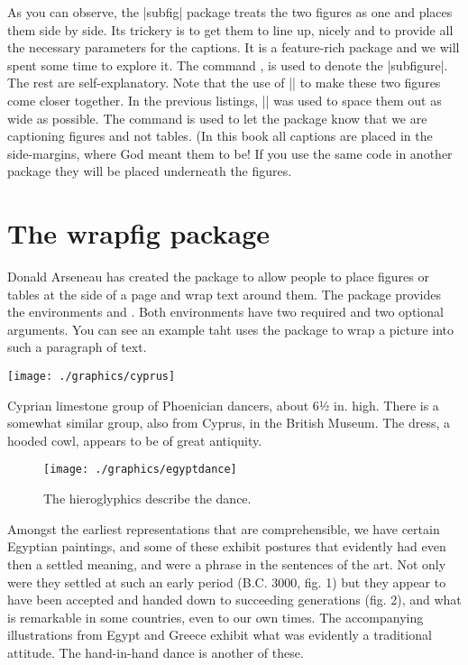 As you can observe, the |subfig| package treats the two figures as one and places them side by side. Its trickery is to get them to line up, nicely and to provide all the necessary parameters for the captions. It is a feature-rich package and we will spent some time to explore it. The command , is used to denote the |subfigure|. The rest are self-explanatory. Note that the use of |\hspace{1cm}| to make these two figures come closer together. In the previous listings, |\hfill| was used to space them out as wide as possible. The command  is used to let the package know that we are captioning figures and not tables. (In this book all captions are placed in the side-margins, where God meant them to be! If you use the same code in another package they will be placed underneath the figures.


\section{The wrapfig package}


\captionsetup[wrapfigure]{margin=10pt,font=small,labelfont=bf, name=Fig.} %


Donald Arseneau has created the  package to allow people to place figures or
tables at the side of a page and wrap text around them. The package provides the
environments  and . Both environments have two required and
two optional arguments. You can see an example taht uses the package to wrap a picture into such a paragraph of text.
\begin{marginfigure}[82pt]
   \texttt{[image: ./graphics/cyprus]} 
   \caption{\small Cyprian limestone group of Phoenician dancers, about 6½ in. high. There is a somewhat similar group, also from Cyprus, in the British Museum. The dress, a hooded cowl, appears to be of great antiquity.}
\end{marginfigure}
\begin{wrapfigure}[20]{l}{3.8cm}
\centering\small
\texttt{[image: ./graphics/egyptdance]}  %
\caption{\small The hieroglyphics describe the dance.}
\end{wrapfigure}
Amongst the earliest representations that are comprehensible, we have certain Egyptian paintings, and some of these exhibit postures that evidently had even then a settled meaning, and were a phrase in the sentences of the art. Not only were they settled at such an early period (B.C. 3000, fig. 1) but they appear to have been accepted and handed down to succeeding generations (fig. 2), and what is remarkable in some countries, even to our own times. The accompanying illustrations from Egypt and Greece exhibit what was evidently a traditional attitude. The hand-in-hand dance is another of these.

